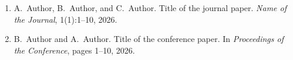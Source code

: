 \begin{publication}

\begin{enumerate}
\item A.~Author, B.~Author, and C.~Author. Title of the journal paper. \emph{Name of the Journal}, 1(1):1--10, 2026.
\item B.~Author and A.~Author. Title of the conference paper. In \emph{Proceedings of the Conference}, pages 1--10, 2026.
\end{enumerate}

\end{publication}

